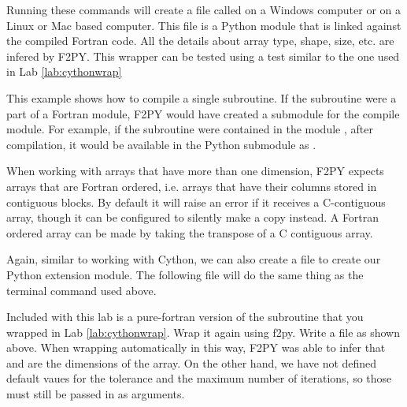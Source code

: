 Running these commands will create a file called  on a Windows computer or  on a Linux or Mac based computer.
This file is a Python module that is linked against the compiled Fortran code.
All the details about array type, shape, size, etc. are infered by F2PY.
This wrapper can be tested using a test similar to the one used in Lab \ref{lab:cythonwrap}

\begin{info}
This example shows how to compile a single subroutine.
If the subroutine were a part of a Fortran module, F2PY would have created a submodule for the compile module.
For example, if the subroutine were contained in the module , after compilation, it would be available in the Python submodule  as .
\end{info}

\begin{warn}
When working with arrays that have more than one dimension, F2PY expects arrays that are Fortran ordered, i.e. arrays that have their columns stored in contiguous blocks.
By default it will raise an error if it receives a C-contiguous array, though it can be configured to silently make a copy instead.
A Fortran ordered array can be made by taking the transpose of a C contiguous array.
\end{warn}

Again, similar to working with Cython, we can also create a  file to create our Python extension module.
The following  file will do the same thing as the terminal command used above.


\begin{problem}
Included with this lab is a pure-fortran version of the  subroutine that you wrapped in Lab \ref{lab:cythonwrap}.
Wrap it again using f2py.
Write a  file as shown above.
When wrapping automatically in this way, F2PY was able to infer that  and  are the dimensions of the array.
On the other hand, we have not defined default vaues for the tolerance and the maximum number of iterations, so those must still be passed in as arguments.
\end{problem}

